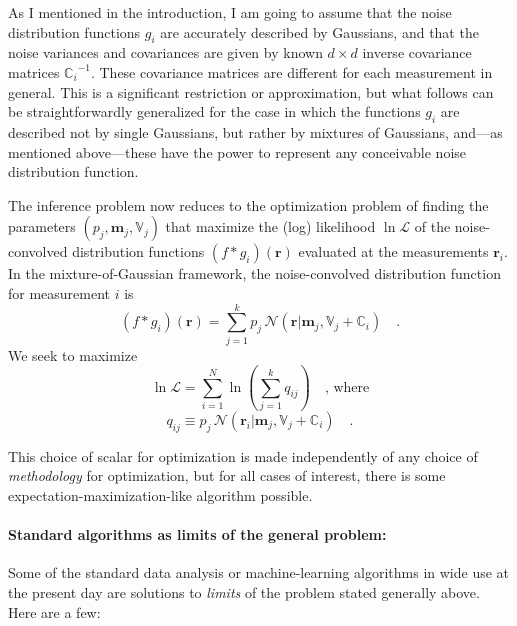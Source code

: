 \documentclass[12pt]{article}
\newcommand{\Mvector}[1]{\boldsymbol{#1}}
\newcommand{\measurement}{\Mvector{r}}
\newcommand{\measurementi}{\measurement_i}
\newcommand{\mean}{\Mvector{m}}
\newcommand{\meanj}{\mean_j}
\newcommand{\truedist}{f}
\newcommand{\noisedisti}{g_i}
\newcommand{\gaussian}{\mathcal{N}\!}
\newcommand{\lnlike}{\ln\mathcal{L}}
\newcommand{\ampj}{p_j}
\newcommand{\ampij}{q_{ij}}
\newcommand{\Mmatrix}[1]{\mathbb{#1}}
\newcommand{\varj}{\Mmatrix{V}_j}
\newcommand{\covari}{\Mmatrix{C}_i}
\newcommand{\inverse}[1]{{#1}^{-1}}
\newcommand{\invcovari}{\inverse{\covari}}
\begin{document}
As I mentioned in the introduction, I am going to assume that the
noise distribution functions $\noisedisti$ are accurately described by
Gaussians, and that the noise variances and covariances are given by
known $d\times d$ inverse covariance matrices $\invcovari$.  These
covariance matrices are different for each measurement in general.
This is a significant restriction or approximation, but what follows
can be straightforwardly generalized for the case in which the
functions $\noisedisti$ are described not by single Gaussians, but
rather by mixtures of Gaussians, and---as mentioned above---these have
the power to represent any conceivable noise distribution function.

The inference problem now reduces to the optimization problem of
finding the parameters $(\ampj,\meanj,\varj)$ that maximize the (log)
likelihood $\lnlike$ of the noise-convolved distribution functions
$(\truedist * \noisedisti)(\measurement)$ evaluated at the
measurements $\measurementi$.  In the mixture-of-Gaussian framework,
the noise-convolved distribution function for measurement $i$ is
\begin{equation}
(\truedist * \noisedisti)(\measurement) =
  \sum_{j=1}^k\ampj\,\gaussian(\measurement|\meanj,\varj+\covari)
\quad .
\end{equation}
We seek to maximize
\begin{equation}
\lnlike = \sum_{i=1}^N
  \ln\left( \sum_{j=1}^k\ampij \right)
\quad \mbox{, where}
\end{equation}
\begin{equation}\label{eq:ampij}
\ampij\equiv \ampj\,\gaussian(\measurementi|\meanj,\varj+\covari)
\quad .
\end{equation}

This choice of scalar for optimization is made independently of any
choice of \emph{methodology} for optimization, but for all cases of
interest, there is some expectation-maximization-like algorithm
possible.

\paragraph{Standard algorithms as limits of the general problem:}
Some of the standard data analysis or machine-learning algorithms in
wide use at the present day are solutions to \emph{limits} of the
problem stated generally above.  Here are a few:
\end{document}
